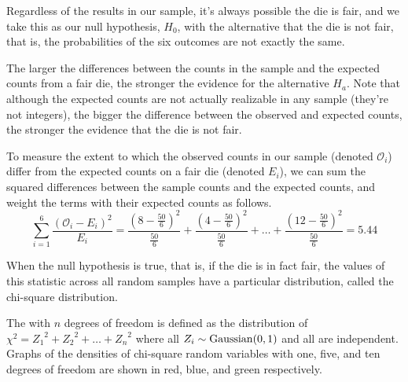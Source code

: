 Regardless of the results in our sample, it's always possible the die is fair, and we take this as our null hypothesis, $H_0$, with the alternative that the die is not fair, that is, the probabilities of the six outcomes are not exactly the same.

The larger the differences between the counts in the sample and the expected counts from a fair die, the stronger the evidence for the alternative $H_a$. Note that although the expected counts are not actually realizable in any sample (they're not integers), the bigger the difference between the observed and expected counts, the stronger the evidence that the die is not fair.

To measure the extent to which the observed counts in our sample (denoted $\mathcal{O}_i$) differ from the expected counts on a fair die (denoted $E_i$), we can sum the squared differences between the sample counts and the expected counts, and weight the terms with their expected counts as follows.
$$\sum_{i=1}^6 \frac{(\mathcal{O}_i - E_i)^2}{E_i} = \frac{(8-\frac{50}{6})^2}{\frac{50}{6}} + \frac{(4-\frac{50}{6})^2}{\frac{50}{6}} + \dots + \frac{(12-\frac{50}{6})^2}{\frac{50}{6}} = 5.44 $$

When the null hypothesis is true, that is, if the die is in fact fair, the values of this statistic across all random samples have a particular distribution, called the chi-square distribution.

\begin{definition}
The  with $n$ degrees of freedom is defined as the distribution of $\chi^2 = {Z_1}^2 + {Z_2}^2 + \dots + {Z_n}^2$ where all $Z_i \sim \operatorname{Gaussian}(0,1)$ and all are independent. Graphs of the densities of chi-square random variables with one, five, and ten degrees of freedom are shown in red, blue, and green respectively.
\end{definition}
\begin{center}
\end{center}

